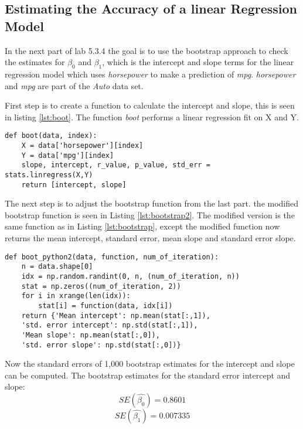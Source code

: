\subsection{Estimating the Accuracy of a linear Regression Model}

In the next part of lab 5.3.4 the goal is to use the bootstrap approach to check the estimates for $\beta_0$ and $\beta_1$, which is the intercept and slope terms for the linear regression model which uses \emph{horsepower} to make a prediction of \emph{mpg}. \emph{horsepower} and \emph{mpg} are part of the \emph{Auto} data set.

First step is to create a function to calculate the intercept and slope, this is seen in listing \ref{lst:boot}. The function \emph{boot} performs a linear regression fit on X and Y. 

\begin{lstlisting}[caption={Boot function in python}, label=lst:boot, mathescape=true]
def boot(data, index):
	X = data['horsepower'][index]
	Y = data['mpg'][index]
	slope, intercept, r_value, p_value, std_err = stats.linregress(X,Y)
	return [intercept, slope]
\end{lstlisting}

The next step is to adjust the bootstrap function from the last part. the modified bootstrap function is seen in Listing \ref{lst:bootstrap2}. The modified version is the same function as in Listing \ref{lst:bootstrap}, except the modified function now returns the mean intercept, standard error, mean slope and standard error slope.

\begin{lstlisting}[caption={Modified boot function in python}, label=lst:bootstrap2, mathescape=true]
def boot_python2(data, function, num_of_iteration):
	n = data.shape[0]
	idx = np.random.randint(0, n, (num_of_iteration, n))
	stat = np.zeros((num_of_iteration, 2))
	for i in xrange(len(idx)):
		stat[i] = function(data, idx[i])
	return {'Mean intercept': np.mean(stat[:,1]), 
	'std. error intercept': np.std(stat[:,1]), 
	'Mean slope': np.mean(stat[:,0]), 
	'std. error slope': np.std(stat[:,0])}
\end{lstlisting}

Now the standard errors of 1,000 bootstrap estimates for the intercept and slope can be computed.
The bootstrap estimates for the standard error intercept and slope:
\begin{equation}
SE(\hat{\beta_0}) = 0.8601
\end{equation} 
\begin{equation}
SE(\hat{\beta_1}) = 0.007335
\end{equation}

